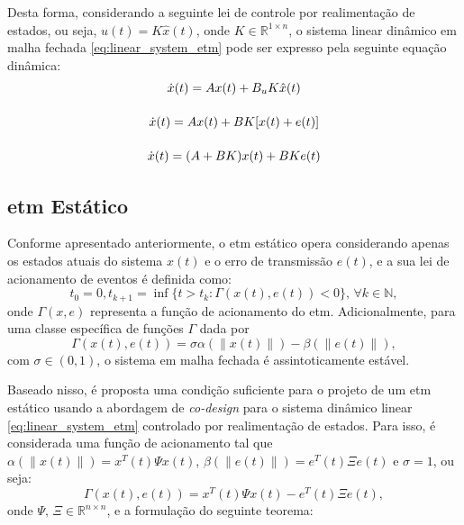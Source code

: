 Desta forma, considerando a seguinte lei de controle por realimentação de estados, ou seja, $u(t) = K\hat{x}(t)$, onde $K \in \mathbb{R}^{1 \times n}$, o sistema linear dinâmico em malha fechada \eqref{eq:linear_system_etm} pode ser expresso pela seguinte equação dinâmica: \begin{gather}
  \dot{x}(t) = Ax(t) + B_u K\hat{x}(t) \notag \\[12pt]
  \dot{x}(t) = Ax(t) + BK[x(t) + e(t)] \notag \\[12pt]
  \dot{x}(t) = (A + BK)x(t) + BKe(t)
  \label{eq:etm_closed_loop}
\end{gather}



\subsection{\acrshort{etm} Estático}

Conforme apresentado anteriormente, o \acrshort{etm} estático opera considerando apenas os estados atuais do sistema $x(t)$ e o erro de transmissão $e(t)$, e a sua lei de acionamento de eventos é definida como: \begin{equation} t_0 = 0, t_{k+1} = \inf \{t > t_k : \Gamma(x(t), e(t)) < 0 \}, \, \forall k \in \mathbb{N}, \label{eq:static_etm}\end{equation} onde $\Gamma(x, e)$ representa a função de acionamento do \acrshort{etm}. Adicionalmente, para uma classe específica de funções $\Gamma$ dada por \begin{equation}
  \Gamma(x(t), e(t)) = \sigma \alpha(\|x(t)\|) - \beta(\|e(t)\|),
\end{equation} com $\sigma \in (0,1)$, o sistema em malha fechada é assintoticamente estável.

Baseado nisso, é proposta uma condição suficiente para o projeto de um \acrshort{etm} estático usando a abordagem de \textit{co-design} para o sistema dinâmico linear \eqref{eq:linear_system_etm} controlado por realimentação de estados. Para isso, é considerada uma função de acionamento tal que $\alpha(\|x(t)\|) = x^T(t)\Psi x(t)$, $\beta(\|e(t)\|) = e^T(t)\Xi e(t)$ e $\sigma = 1$, ou seja:  \begin{equation}
  \Gamma(x(t), e(t)) = x^T(t)\Psi x(t) - e^T(t)\Xi e(t),
  \label{eq:etm_gamma}
\end{equation}  onde $\Psi, \, \Xi \in \mathbb{R}^{n \times n}$, e a formulação do seguinte teorema:

